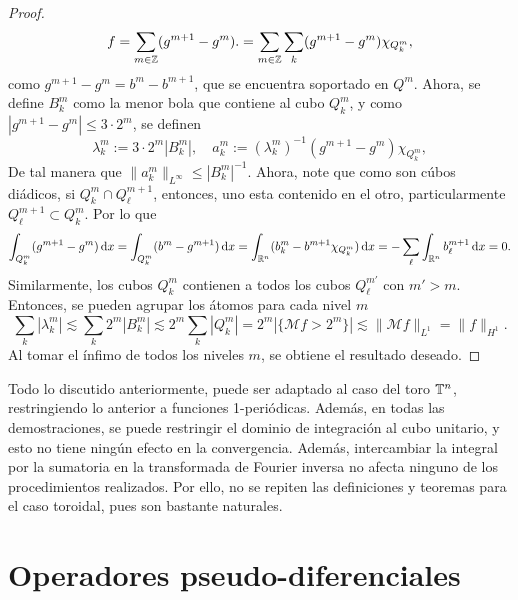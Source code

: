 \begin{proof}
	\begin{equation*}
		f = \sum_{m\in\mathbb{Z}} (g^{m+1}-g^m). = \sum_{m\in\mathbb{Z}}\sum_k (g^{m+1}-g^m)\chi_{Q_k^m},
	\end{equation*}
	como $g^{m+1}-g^m = b^m - b^{m+1}$, que se encuentra soportado en $Q^m$. Ahora, se define $B_k^m$ como la menor bola que contiene al cubo $Q_k^m$, y como $|g^{m+1}-g^{m}| \leq 3\cdot2^{m}$, se definen
	\begin{equation*}
		\lambda_k^m := 3\cdot 2^m |B_k^m|, \quad a_k^m := (\lambda_k^m)^{-1} (g^{m+1}-g^m)\chi_{Q_k^m}, 
	\end{equation*}
	De tal manera que $\|a_k^m\|_{L^\infty} \leq |B_k^m|^{-1}$. Ahora, note que como son cúbos diádicos, si $Q_k^m \cap Q_\ell^{m+1}$, entonces, uno esta contenido en el otro, particularmente $Q_\ell^{m+1}\subset Q_k^m$. Por lo que 
	\begin{equation*}
		\int_{Q_k^m}(g^{m+1}-g^m) \mathop{}\!\mathrm{d} x = \int_{Q_k^m}(b^{m}-g^{m+1}) \mathop{}\!\mathrm{d} x = \int_{\mathbb{R}^n}(b_k^m - b^{m+1}\chi_{Q_k^m}) \mathop{}\!\mathrm{d} x = -\sum_\ell  \int_{\mathbb{R}^n} b^{m+1}_\ell\mathop{}\!\mathrm{d} x = 0.
	\end{equation*}
	Similarmente, los cubos $Q_k^m$ contienen a todos los cubos $Q_\ell^{m'}$ con $m'>m$. Entonces, se pueden agrupar los átomos para cada nivel $m$
	\begin{equation*}
		\sum_{k} |\lambda_k^m|  \lesssim \sum_{k} 2^m|B_k^m| \lesssim 2^m\sum_{k} |Q_k^m| = 2^m|\{\mathcal{M}f>2^m\}|  \lesssim \| \mathcal{M}f\|_{L^1} = \|f\|_{H^1}.
	\end{equation*}
	Al tomar el ínfimo de todos los niveles $m$, se obtiene el resultado deseado.
\end{proof}
\begin{remark}
	Todo lo discutido anteriormente, puede ser adaptado al caso del toro $\mathbb{T}^n$, restringiendo lo anterior a funciones 1-periódicas. Además, en todas las demostraciones, se puede restringir el dominio de integración al cubo unitario, y esto no tiene ningún efecto en la convergencia. Además, intercambiar la integral por la sumatoria en la transformada de Fourier inversa no afecta ninguno de los procedimientos realizados. Por ello, no se repiten las definiciones y teoremas para el caso toroidal, pues son bastante naturales.
\end{remark}
\chapter{Operadores pseudo-diferenciales}
